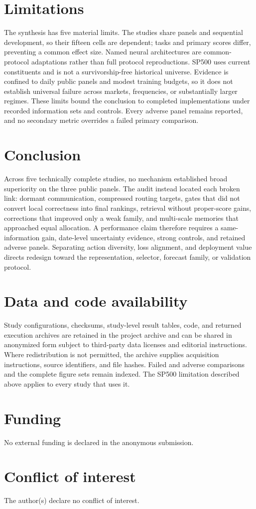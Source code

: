 \documentclass{crebss}
\begin{document}
\section{Limitations}

The synthesis has five material limits. The studies share panels and sequential development, so their fifteen cells are dependent; tasks and primary scores differ, preventing a common effect size. Named neural architectures are common-protocol adaptations rather than full protocol reproductions. SP500 uses current constituents and is not a survivorship-free historical universe. Evidence is confined to daily public panels and modest training budgets, so it does not establish universal failure across markets, frequencies, or substantially larger regimes. These limits bound the conclusion to completed implementations under recorded information sets and controls. Every adverse panel remains reported, and no secondary metric overrides a failed primary comparison.

\section{Conclusion}

Across five technically complete studies, no mechanism established broad superiority on the three public panels. The audit instead located each broken link: dormant communication, compressed routing targets, gates that did not convert local correctness into final rankings, retrieval without proper-score gains, corrections that improved only a weak family, and multi-scale memories that approached equal allocation. A performance claim therefore requires a same-information gain, date-level uncertainty evidence, strong controls, and retained adverse panels. Separating action diversity, loss alignment, and deployment value directs redesign toward the representation, selector, forecast family, or validation protocol.

\section*{Data and code availability}

Study configurations, checksums, study-level result tables, code, and returned execution archives are retained in the project archive and can be shared in anonymized form subject to third-party data licenses and editorial instructions. Where redistribution is not permitted, the archive supplies acquisition instructions, source identifiers, and file hashes. Failed and adverse comparisons and the complete figure sets remain indexed. The SP500 limitation described above applies to every study that uses it.

\section*{Funding}

No external funding is declared in the anonymous submission.

\section*{Conflict of interest}

The author(s) declare no conflict of interest.


\end{document}
